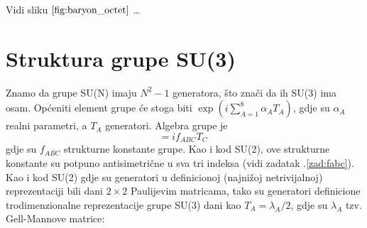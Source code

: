 Vidi sliku $\ref{fig:baryon_octet}$ \dots

\section{Struktura grupe SU(3)}

Znamo da grupe SU(N) imaju $N^2-1$ generatora, što znači da ih SU(3) ima osam.
Općeniti element grupe će stoga biti $\exp(i \sum_{A=1}^8 \alpha_A T_{A})$, gdje
su $\alpha_A$ realni parametri, a $T_A$ generatori. Algebra grupe je
\begin{equation}
  [ T_{A}, T_{B} ] = i f_{ABC} T_C \;
\label{eq:SU3}
\end{equation}
gdje su $f_{ABC}$ strukturne konstante grupe. Kao i kod SU(2), ove strukturne
konstante su potpuno antisimetrične u sva tri indeksa (vidi zadatak \thechapter.\ref{zad:fabc}).
Kao i kod SU(2) gdje su generatori u definicionoj (najnižoj netrivijalnoj)
reprezentaciji bili dani $2\times 2$ Paulijevim matricama, tako su generatori
definicione trodimenzionalne reprezentacije grupe SU(3) dani kao
$T_A = \lambda_A/2$, gdje su $\lambda_A$ tzv. Gell-Mannove matrice:

